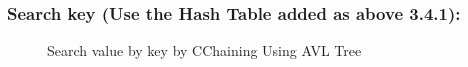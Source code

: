 \subsubsection{Search key (Use the Hash Table added as above 3.4.1):}
\begin{figure}[H]
	\centering
	\qquad
	\caption{Search value by key by CChaining Using AVL Tree}%
\end{figure}

